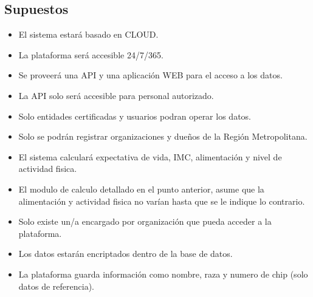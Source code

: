 \documentclass[letterpaper,openright,10pt,oneside]{report}
\begin{document}
			\subsection{Supuestos}
			\begin{itemize}
	\item El sistema estará basado en CLOUD.
	\item La plataforma será accesible 24/7/365.
	\item Se proveerá una API y una aplicación WEB para el acceso a los datos.
	\item La API solo será accesible para personal autorizado.
	\item Solo entidades certificadas y usuarios podran operar los datos.
	\item Solo se podrán registrar organizaciones y dueños de la Región Metropolitana.
	\item El sistema calculará expectativa de vida, IMC, alimentación y nivel de actividad fisica.
	\item El modulo de calculo detallado en el punto anterior, asume que la alimentación y actividad fisica no varían hasta que se le indique lo contrario.
	\item Solo existe un/a encargado por organización que pueda acceder a la plataforma.
	\item Los datos estarán encriptados dentro de la base de datos.
	\item La plataforma guarda información como nombre, raza y numero de chip (solo datos de referencia).
	\end{itemize}
\end{document}
